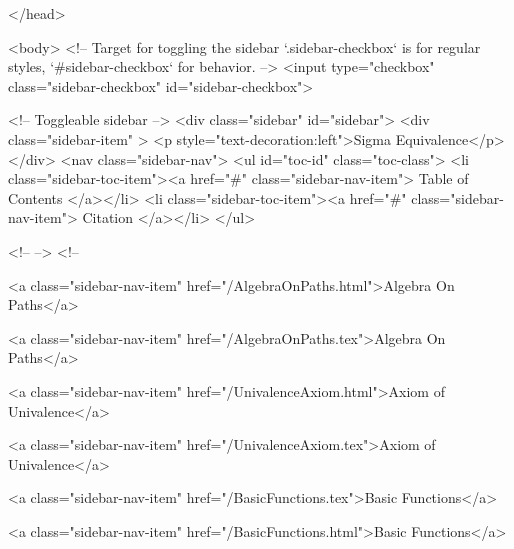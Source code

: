   
</head>




  <body>
    <!-- Target for toggling the sidebar `.sidebar-checkbox` is for regular
     styles, `#sidebar-checkbox` for behavior. -->
<input type="checkbox" class="sidebar-checkbox" id="sidebar-checkbox">

<!-- Toggleable sidebar -->
<div class="sidebar" id="sidebar">
  <div class="sidebar-item" >
    <p style="text-decoration:left">Sigma Equivalence</p>
  </div>
  <nav class="sidebar-nav">
    <ul id="toc-id" class="toc-class">
  <li class="sidebar-toc-item"><a href="#" class="sidebar-nav-item"> Table of Contents </a></li>
  <li class="sidebar-toc-item"><a href="#" class="sidebar-nav-item"> Citation </a></li>
</ul>


    <!--  -->
    <!-- 
      
    
      
    
      
    
      
        
      
    
      
        
          <a class="sidebar-nav-item" href="/AlgebraOnPaths.html">Algebra On Paths</a>
        
      
    
      
        
          <a class="sidebar-nav-item" href="/AlgebraOnPaths.tex">Algebra On Paths</a>
        
      
    
      
        
          <a class="sidebar-nav-item" href="/UnivalenceAxiom.html">Axiom of Univalence</a>
        
      
    
      
        
          <a class="sidebar-nav-item" href="/UnivalenceAxiom.tex">Axiom of Univalence</a>
        
      
    
      
        
          <a class="sidebar-nav-item" href="/BasicFunctions.tex">Basic Functions</a>
        
      
    
      
        
          <a class="sidebar-nav-item" href="/BasicFunctions.html">Basic Functions</a>
        
      
    
      
        
